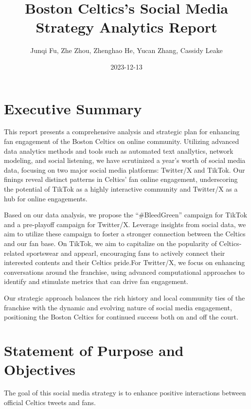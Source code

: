\documentclass[
]{book}
\title{Boston Celtics's Social Media Strategy Analytics Report}
\author{Junqi Fu, Zhe Zhou, Zhenghao He, Yucan Zhang, Cassidy Leake}
\date{2023-12-13}
\begin{document}
\maketitle

{
\setcounter{tocdepth}{1}
\tableofcontents
}
\hypertarget{executive-summary}{%
\chapter{Executive Summary}\label{executive-summary}}

This report presents a comprehensive analysis and strategic plan for enhancing fan engagement of the Boston Celtics on online community. Utilizing advanced data analytics methods and tools such as automated text anallytics, network modeling, and social listening, we have scrutinized a year's worth of social media data, focusing on two major social media platforms: Twitter/X and TikTok. Our finings reveal distinct patterns in Celtics' fan online engagement, underscoring the potential of TikTok as a highly interactive community and Twitter/X as a hub for online engagements.

Based on our data analysis, we propose the ``\#BleedGreen'' campaign for TikTok and a pre-playoff campaign for Twitter/X. Leverage insights from social data, we aim to utilize these campaign to foster a stronger connection between the Celtics and our fan base. On TikTok, we aim to capitalize on the popularity of Celtics-related sportswear and appearl, encouraging fans to actively connect their interested contents and their Celtics pride.For Twitter/X, we focus on enhancing conversations around the franchise, using advanced computational approaches to identify and stimulate metrics that can drive fan engagement.

Our strategic approach balances the rich history and local community ties of the franchise with the dynamic and evolving nature of social media engagement, positioning the Boston Celtics for continued success both on and off the court.

\hypertarget{statement-of-purpose-and-objectives}{%
\chapter{Statement of Purpose and Objectives}\label{statement-of-purpose-and-objectives}}

The goal of this social media strategy is to enhance positive interactions between official Celtics tweets and fans.
\end{document}
